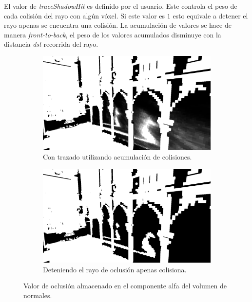 El valor de \emph{traceShadowHit} es definido por el usuario. Este controla el peso de cada colisión del rayo con algún vóxel. Si este valor es $1$ esto equivale a detener el rayo apenas se encuentra una colisión. La acumulación de valores se hace de manera \emph{front-to-back}, el peso de los valores acumulados disminuye con la distancia \emph{dst} recorrida del rayo.

\begin{figure}[H]
	\centering
	\begin{subfigure}[t]{0.49\textwidth}
		\centering
		\captionsetup{justification=centering}
		\includegraphics[width=\linewidth]{media/soft_traced.png}
		\caption*{Con trazado utilizando acumulación de colisiones.}
	\end{subfigure}%
	\hspace{0.01\textwidth}
	\begin{subfigure}[t]{0.49\textwidth}
		\centering
		\captionsetup{justification=centering}
		\includegraphics[width=\linewidth]{media/hard_traced.png}
		\caption*{Deteniendo el rayo de oclusión apenas colisiona.}
	\end{subfigure}%
	\caption{Valor de oclusión almacenado en el componente alfa del volumen de normales.}
	\label{fig:vshadows_hit}
\end{figure}

